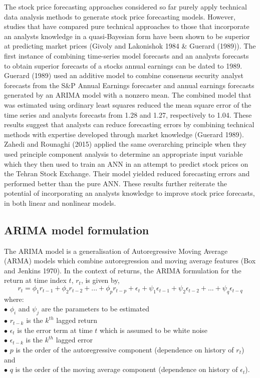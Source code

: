 \documentclass[12pt,a4paper]{article}
\numberwithin{equation}{section}
\numberwithin{figure}{section}
\numberwithin{table}{section}
\begin{document}
The stock price forecasting approaches considered so far purely apply
technical data analysis methods to generate stock price forecasting
models. However, studies that have compared pure technical approaches to
those that incorporate an analysts knowledge in a quasi-Bayesian form
have been shown to be superior at predicting market prices (Givoly and
Lakonishok 1984 \& Guerard (1989)). The first instance of combining
time-series model forecasts and an analysts forecasts to obtain superior
forecasts of a stocks annual earnings can be dated to 1989. Guerard
(1989) used an additive model to combine consensus security analyst
forecasts from the S\&P Annual Earnings forecaster and annual earnings
forecasts generated by an ARIMA model with a nonzero mean. The combined
model that was estimated using ordinary least squares reduced the mean
square error of the time series and analysts forecasts from 1.28 and
1.27, respectively to 1.04. These results suggest that analysts can
reduce forecasting errors by combining technical methods with expertise
developed through market knowledge (Guerard 1989). Zahedi and Rounaghi
(2015) applied the same overarching principle when they used principle
component analysis to determine an appropriate input variable which they
then used to train an ANN in an attempt to predict stock prices on the
Tehran Stock Exchange. Their model yielded reduced forecasting errors
and performed better than the pure ANN. These results further reiterate
the potential of incorporating an analysts knowledge to improve stock
price forecasts, in both linear and nonlinear models.

\subsection{ARIMA model formulation}\label{arima-model-formulation}

The ARIMA model is a generalisation of Autoregressive Moving Average
(ARMA) models which combine autoregression and moving average features
(Box and Jenkins 1970). In the context of returns, the ARIMA formulation
for the return at time index \(t\), \(r_t\), is given by,
\[  r_t = \phi_1 r_{t-1} + \phi_2 r_{t-2} + ...+ \phi_p r_{t-p} + \epsilon_t +
        \psi_1 \epsilon_{t-1} + \psi_2 \epsilon_{t-2} + ... +\psi_q \epsilon_{t-q} \]where:\\
\(\bullet\) \(\phi_i\) and \(\psi_j\) are the parameters to be
estimated\\
\(\bullet\) \(r_{t-k}\) is the \(k^{th}\) lagged return\\
\(\bullet\) \(\epsilon_t\) is the error term at time \(t\) which is
assumed to be white noise\\
\(\bullet\) \(\epsilon_{t-k}\) is the \(k^{th}\) lagged error\\
\(\bullet\) \(p\) is the order of the autoregressive component
(dependence on history of \(r_t\)) and\\
\(\bullet\) \(q\) is the order of the moving average component
(dependence on history of \(\epsilon_t\)).
\end{document}
